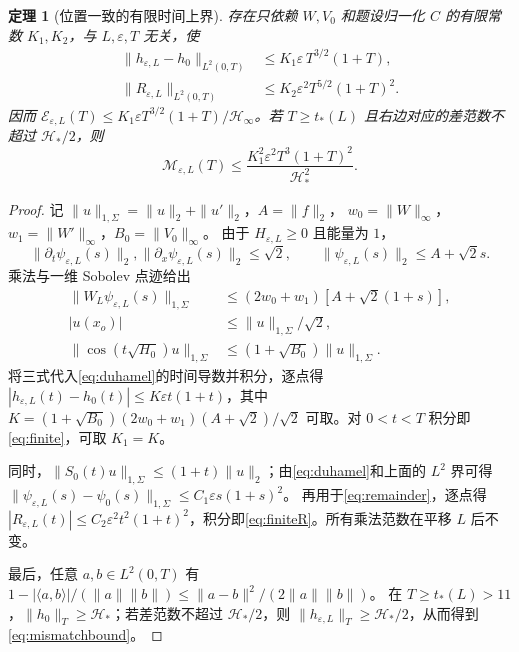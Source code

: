 \documentclass[UTF8,a4paper,11pt]{ctexart}
\newtheorem{theorem}{定理}
\newcommand{\ee}{\varepsilon}
\newcommand{\HH}{\mathcal H}
\begin{document}
\begin{theorem}[位置一致的有限时间上界]\label{thm:finite}
存在只依赖 $W,V_0$ 和题设归一化 $C$ 的有限常数 $K_1,K_2$，与 $L,\ee,T$ 无关，使
\begin{align}
 \|h_{\ee,L}-h_0\|_{L^2(0,T)}
 &\leq K_1\ee\,T^{3/2}(1+T),\label{eq:finite}\\
 \|R_{\ee,L}\|_{L^2(0,T)}
 &\leq K_2\ee^2 T^{5/2}(1+T)^2.\label{eq:finiteR}
\end{align}
因而 $\mathcal E_{\ee,L}(T)\leq K_1\ee T^{3/2}(1+T)/\HH_\infty$。若 $T\geq t_*(L)$ 且右边对应的差范数不超过 $\HH_*/2$，则
\begin{equation}\label{eq:mismatchbound}
 \mathcal M_{\ee,L}(T)
 \leq\frac{K_1^2\ee^2 T^3(1+T)^2}{\HH_*^2}.
\end{equation}
\end{theorem}
\begin{proof}
记 $\|u\|_{1,\Sigma}=\|u\|_2+\|u'\|_2$，$A=\|f\|_2$，
$w_0=\|W\|_\infty$，$w_1=\|W'\|_\infty$，$B_0=\|V_0\|_\infty$。
由于 $H_{\ee,L}\geq0$ 且能量为 $1$，
\begin{equation*}
 \|\partial_t\psi_{\ee,L}(s)\|_2,
 \|\partial_x\psi_{\ee,L}(s)\|_2\leq\sqrt2,
 \qquad \|\psi_{\ee,L}(s)\|_2\leq A+\sqrt2s.
\end{equation*}
乘法与一维 Sobolev 点迹给出
\begin{align*}
 \|W_L\psi_{\ee,L}(s)\|_{1,\Sigma}
 &\leq (2w_0+w_1)[A+\sqrt2(1+s)],\\
 |u(x_o)|&\leq\|u\|_{1,\Sigma}/\sqrt2,\\
 \|\cos(t\sqrt{H_0})u\|_{1,\Sigma}
 &\leq(1+\sqrt{B_0})\|u\|_{1,\Sigma}.
\end{align*}
将三式代入\eqref{eq:duhamel}的时间导数并积分，逐点得
$|h_{\ee,L}(t)-h_0(t)|\leq K\ee t(1+t)$，其中
$K=(1+\sqrt{B_0})(2w_0+w_1)(A+\sqrt2)/\sqrt2$ 可取。对 $0<t<T$ 积分即\eqref{eq:finite}，可取 $K_1=K$。

同时，$\|S_0(t)u\|_{1,\Sigma}\leq(1+t)\|u\|_2$；由\eqref{eq:duhamel}和上面的 $L^2$ 界可得
$\|\psi_{\ee,L}(s)-\psi_0(s)\|_{1,\Sigma}
 \leq C_1\ee s(1+s)^2$。
再用于\eqref{eq:remainder}，逐点得 $|R_{\ee,L}(t)|\leq C_2\ee^2 t^2(1+t)^2$，积分即\eqref{eq:finiteR}。所有乘法范数在平移 $L$ 后不变。

最后，任意 $a,b\in L^2(0,T)$ 有
$1-|\langle a,b\rangle|/(\|a\|\|b\|)
 \leq\|a-b\|^2/(2\|a\|\|b\|)$。
在 $T\geq t_*(L)>11$，$\|h_0\|_T\geq\HH_*$；若差范数不超过 $\HH_*/2$，则 $\|h_{\ee,L}\|_T\geq\HH_*/2$，从而得到\eqref{eq:mismatchbound}。
\end{proof}
\end{document}
